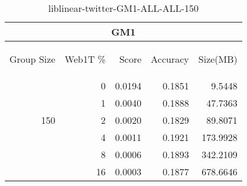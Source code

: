 \begin{center}
\begin{table}[htbp]
\begin{tabular}{ | r | r | r | r | r |}
\hline
\multicolumn{5}{|c|}{GM1}\\
\hline
\begin{sideways}Group Size\end{sideways} & \begin{sideways}Web1T \%\end{sideways} & \begin{sideways}Score\end{sideways} & \begin{sideways}Accuracy\end{sideways} & \begin{sideways}Size(MB)\end{sideways}\\
\hline
\multirow{5}{*}{150}
 & 0 & 0.0194 & 0.1851 & 9.5448\\ \cline{2-5}
 & 1 & 0.0040 & 0.1888 & 47.7363\\ \cline{2-5}
 & 2 & 0.0020 & 0.1829 & 89.8071\\ \cline{2-5}
 & 4 & 0.0011 & 0.1921 & 173.9928\\ \cline{2-5}
 & 8 & 0.0006 & 0.1893 & 342.2109\\ \cline{2-5}
 & 16 & 0.0003 & 0.1877 & 678.6646\\ \cline{2-5}
\hline
\end{tabular}
\caption{liblinear-twitter-GM1-ALL-ALL-150}
\label{table:liblinear-twitter-GM1-ALL-ALL-150}
\end{table}
\end{center}

